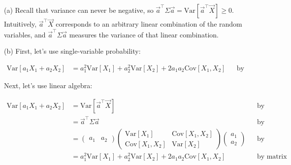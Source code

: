 \documentclass[12pt,oneside]{article}
\newcommand{\Var}{\text{Var}}
\newcommand{\Cov}{\text{Cov}}
\newcommand{\OLS}{\text{OLS}}
\newcommand{\MVN}{\text{MVN}}
\theoremstyle{definition}
\newtheorem{problem}{\faPen \ Problem}
\theoremstyle{remark}
\begin{document}
\begin{solutionbox}
(a) Recall that variance can never be negative, so $\vec{a}^{\top} \Sigma \vec{a} = \Var[\vec{a}^{\top} \vec{X}] \geq 0$. Intuitively, $\vec{a}^{\top} \vec{X}$ corresponds to an arbitrary linear combination of the random variables, and $\vec{a}^{\top} \Sigma \vec{a}$ measures the variance of that linear combination.

(b) First, let's use single-variable probability:

\[
\begin{aligned}
\Var[a_1 X_1 + a_2 X_2] &= a_1^2 \Var[X_1] + a_2^2 \Var[X_2] + 2 a_1 a_2 \Cov[X_1, X_2] && \text{by bilinearity}
\end{aligned}
\]

Next, let's use linear algebra:

\[
\begin{aligned}
\Var[a_1 X_1 + a_2 X_2] &= \Var[\vec{a}^{\top} \vec{X}] && \text{by rewriting} \\
&= \vec{a}^{\top} \Sigma \vec{a} && \text{by quadratic form} \\
&= 
\begin{pmatrix}
a_1 & a_2
\end{pmatrix}
\begin{pmatrix}
\Var[X_1] & \Cov[X_1, X_2] \\
\Cov[X_1, X_2] & \Var[X_2]
\end{pmatrix}
\begin{pmatrix}
a_1 \\
a_2
\end{pmatrix} && \text{by substituting} \\
&= a_1^2 \Var[X_1] + a_2^2 \Var[X_2] + 2 a_1 a_2 \Cov[X_1, X_2] && \text{by matrix algebra}
\end{aligned}
\]
\end{solutionbox}

\end{document}
